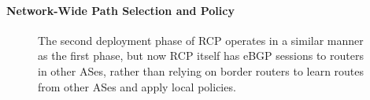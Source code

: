 




\paragraph{Network-Wide Path Selection and Policy}
\label{sec:feamster:fdna2004_ebgp}

\begin{figure}
\centering{}
\caption[The second phase of RCP deployment]{The second deployment phase
of RCP operates in a similar manner 
  as the first phase, but now RCP itself has eBGP sessions
  to routers in other ASes, rather than relying on border routers
  to learn routes from other ASes and apply local policies.}
\label{fig:ebgp}
\end{figure}


